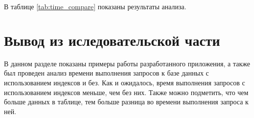 В таблице \ref{tab:time_compare} показаны результаты анализа.

\begin{table}[H]
\caption{Время выполнения запросов с использованием индексов и без}
\label{tab:time_compare}
\centering
{}
\end{table}

\section*{Вывод из иследовательской части}
В данном разделе показаны примеры работы разработанного приложения, а также был проведен анализ времени выполнения запросов к базе данных с использованием индексов и без. Как и ожидалось, время выполнения запросов с использованием индексов меньше, чем без них. Также можно подметить, что чем больше данных в таблице, тем больше разница во времени выполнения запроса к ней.